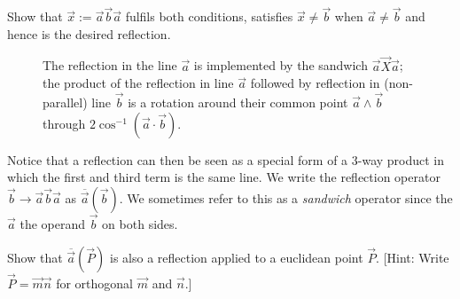 \documentclass[12pt]{article}
\newcommand{\mydogblue}{{\color{gray} $\square$~~}}
\begin{document}
{ \myexercise  Show that $\vec{x} := \vec{a}\vec{b}\vec{a}$ fulfils both conditions, satisfies $\vec{x} \neq \vec{b}$ when $\vec{a} \neq \vec{b}$ and hence is the desired reflection. %
  \begin{figure}
   \centering
{\setlength\fboxsep{0pt}}
\caption{The reflection in the line $\vec{a}$ is implemented by the sandwich $\vec{a}\vec{X}\vec{a}$; the product of the reflection in line $\vec{a}$ followed by reflection in (non-parallel) line $\vec{b}$ is a rotation around their common point $\vec{a}\wedge\vec{b}$ through $2 \cos^{-1}(\vec{a}\cdot\vec{b})$.}
\label{fig:rotationab}
\end{figure}


Notice that a reflection can then be seen as a special form of a 3-way product in which the first and third term is the same line.
 We write the reflection operator $\vec{b} \rightarrow \vec{a}\vec{b} \vec{a}$ as $\overline{\vec{a}}(\vec{b})$.   We sometimes refer to this as a \emph{sandwich} operator since the $\vec{a}$  the operand $\vec{b}$ on both sides. 

\myexercise  Show that $\overline{\vec{a}}(\vec{P})$ is also a reflection applied to a euclidean point $\vec{P}$. [Hint: Write $\vec{P}= \vec{m}\vec{n}$ for orthogonal $\vec{m}$ and $\vec{n}$.] %

}
\end{document}
